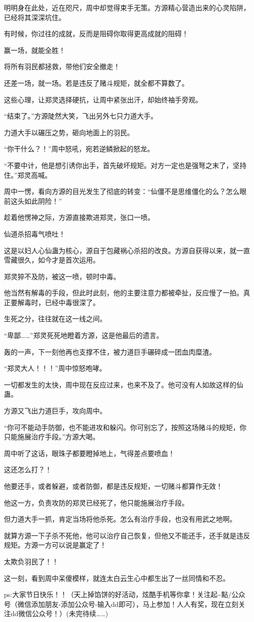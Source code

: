 \begin{this_body}
明明身在此处，近在咫尺，周中却觉得束手无策。方源精心营造出来的心灵陷阱，已经将其深深坑住。

有时候，你过往的成就，反而是阻碍你取得更高成就的阻碍！

赢一场，就能全胜！

将所有羽民都拯救，带他们安全撤走！

还差一场，就一场。若是违反了赌斗规矩，就全都不算数了。

这些心理，让郑灵选择硬抗，让周中紧张出汗，却始终袖手旁观。

“结束了。”方源陡然大笑，飞出另外七只力道大手。

力道大手以碾压之势，砸向地面上的羽民。

“你干什么？！”周中怒吼，宛若逆鳞掀起的怒龙。

“不要中计，他是想引诱你出手，首先破坏规矩。对方一定也是强弩之末了，坚持住。”郑灵高喊。

周中一愣，看向方源的目光发生了彻底的转变：“仙僵不是思维僵化的么？怎么眼前这头如此阴险！”

趁着他愣神之际，方源直接欺进郑灵，张口一喷。

仙道杀招毒气喷吐！

这是以妇人心仙蛊为核心，源自于包藏祸心杀招的改良。方源自获得以来，就一直雪藏很久，如今才是首次运用。

郑灵猝不及防，被这一喷，顿时中毒。

他当然有解毒的手段，但此时此刻，他的主要注意力都被牵扯，反应慢了一拍。真正要解毒时，已经中毒很深了。

生死之分，往往就在这一线之间。

“卑鄙……”郑灵死死地瞪着方源，这是他最后的遗言。

轰的一声，下一刻他再也支撑不住，被力道巨手碾碎成一团血肉糜渣。

“郑灵大人！！！”周中惊怒咆哮。

一切都发生的太快，周中现在反应过来，也来不及了。他可没有人如故这样的仙蛊。

方源又飞出力道巨手，攻向周中。

“你可不能动手防御，也不能进攻和躲闪。你可别忘了，按照这场赌斗的规矩，你只能施展治疗手段。”方源大喝。

周中听了这话，眼珠子都要瞪掉地上，气得差点要喷血！

这还怎么打？！

他要还手，或者躲避，或者防御，都是违反规矩，一切赌斗都算作无效！

他这一方，负责攻防的郑灵已经死了，他只能施展治疗手段。

但力道大手一抓，肯定当场将他杀死。怎么有治疗手段，也没有用武之地啊。

就算方源一下子杀不死他，他可以治疗自己恢复，但他又不能还手，还手就是违反规矩。方源一方可以说是赢定了！

太欺负羽民了！！

这一刻，看到周中呆傻模样，就连太白云生心中都生出了一丝同情和不忍。

ps:大家节日快乐！！（天上掉馅饼的好活动，炫酷手机等你拿！关注起\~{}點/公众号（微信添加朋友-添加公众号-输入dd即可），马上参加！人人有奖，现在立刻关注dd微信公众号！）(未完待续……)

\end{this_body}

